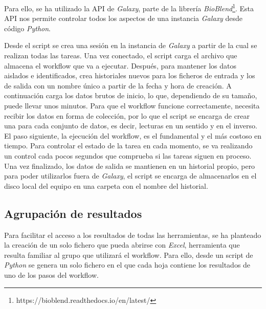Para ello, se ha utilizado la API de \textit{Galaxy}, parte de la librería \textit{BioBlend}\footnote{https://bioblend.readthedocs.io/en/latest/}. Esta API nos permite controlar todos los aspectos de una instancia \textit{Galaxy} desde código \textit{Python}.

Desde el script se crea una sesión en la instancia de \textit{Galaxy} a partir de la cual se realizan todas las tareas. Una vez conectado, el script carga el archivo que almacena el workflow que va a ejecutar. Después, para mantener los datos aislados e identificados, crea historiales nuevos para los ficheros de entrada y los de salida con un nombre único a partir de la fecha y hora de creación. A continuación carga los datos brutos de inicio, lo que, dependiendo de su tamaño, puede llevar unos minutos. Para que el workflow funcione correctamente, necesita recibir los datos en forma de colección, por lo que el script se encarga de crear una para cada conjunto de datos, es decir, lecturas en un sentido y en el inverso. El paso siguiente, la ejecución del workflow, es el fundamental y el más costoso en tiempo. Para controlar el estado de la tarea en cada momento, se va realizando un control cada pocos segundos que comprueba si las tareas siguen en proceso. Una vez finalizado, los datos de salida se mantienen en un historial propio, pero para poder utilizarlos fuera de \textit{Galaxy}, el script se encarga de almacenarlos en el disco local del equipo en una carpeta con el nombre del historial.

\subsection{Agrupación de resultados}
Para facilitar el acceso a los resultados de todas las herramientas, se ha planteado la creación de un solo fichero que pueda abrirse con \textit{Excel}, herramienta que resulta familiar al grupo que utilizará el workflow. Para ello, desde un script de \textit{Python} se genera un solo fichero en el que cada hoja contiene los resultados de uno de los pasos del workflow.



